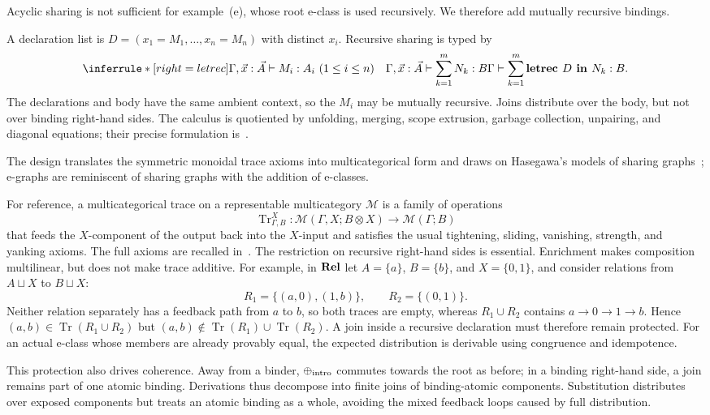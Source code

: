 Acyclic sharing is not sufficient for example~(e), whose root e-class is used recursively.  We therefore add mutually recursive bindings.

\begin{definition}
\label{def:recursive_sharing}
A declaration list is $D=(x_1=M_1,\ldots,x_n=M_n)$ with distinct $x_i$.  Recursive sharing is typed by
\[
\inferrule*[right=letrec]
{\Gamma,\vec x:\vec A\vdash M_i:A_i\ (1\leq i\leq n)
 \quad
 \Gamma,\vec x:\vec A\vdash\sum_{k=1}^{m}N_k:B}
{\Gamma\vdash
 \sum_{k=1}^{m}\textbf{letrec }D\textbf{ in }N_k:B}.
\]
The declarations and body have the same ambient context, so the $M_i$ may be mutually recursive.  Joins distribute over the body, but not over binding right-hand sides.  The calculus is quotiented by unfolding, merging, scope extrusion, garbage collection, unpairing, and diagonal equations; their precise formulation is~.
\end{definition}
The design translates the symmetric monoidal trace axioms into multicategorical
form and draws on Hasegawa's models of sharing graphs~\cite{hasegawa_models_1999};
e-graphs are reminiscent of sharing graphs with the addition of e-classes.

For reference, a multicategorical trace on a representable multicategory
$\mathcal M$ is a family of operations
\[
\operatorname{Tr}_{\Gamma,B}^{X}:
\mathcal M(\Gamma,X;B\otimes X)\longrightarrow\mathcal M(\Gamma;B)
\]
that feeds the $X$-component of the output back into the $X$-input and satisfies
the usual tightening, sliding, vanishing, strength, and yanking axioms.  The
full axioms are recalled in~.
The restriction on recursive right-hand sides is essential.  Enrichment makes composition multilinear, but does not make trace additive.  For example, in $\mathbf{Rel}$ let $A=\{a\}$, $B=\{b\}$, and $X=\{0,1\}$, and consider relations from $A\sqcup X$ to $B\sqcup X$:
\[
R_1=\{(a,0),(1,b)\},
\qquad
R_2=\{(0,1)\}.
\]
Neither relation separately has a feedback path from $a$ to $b$, so both traces are empty, whereas
$R_1\cup R_2$ contains $a\to0\to1\to b$.  Hence $(a,b)\in\operatorname{Tr}(R_1\cup R_2)$ but
$(a,b)\notin\operatorname{Tr}(R_1)\cup\operatorname{Tr}(R_2)$.
A join inside a recursive declaration must therefore remain protected.  For an actual e-class whose members are already provably equal, the expected distribution is derivable using congruence and idempotence.

This protection also drives coherence.  Away from a binder,
$\mathbin{\oplus}_{\mathrm{intro}}$ commutes towards the root as before; in a binding
right-hand side, a join remains part of one atomic binding.  Derivations thus
decompose into finite joins of binding-atomic components.  Substitution
distributes over exposed components but treats an atomic binding as a whole,
avoiding the mixed feedback loops caused by full distribution.


